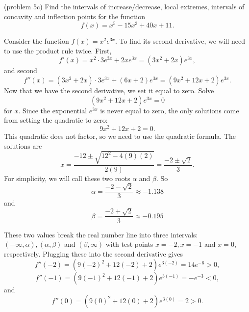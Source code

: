 \documentclass[handout]{ximera}
\begin{document}
\begin{problem}(problem 5c) Find the intervals of increase/decrease, local extremes, intervals of concavity and inflection points for the function
\[
f(x) = x^5 - 15x^3 + 40x + 11.
\]
\end{problem}


\begin{example}[example 6]
Consider the function $f(x) = x^2e^{3x}$.  To find its second derivative, 
we will need to use the product rule twice. First, 
\[f'(x) = x^2 \cdot 3e^{3x} + 2xe^{3x} = (3x^2 + 2x)e^{3x},\]
and second
\[f''(x) = (3x^2 + 2x)\cdot 3e^{3x} + (6x + 2)e^{3x} = (9x^2 + 12x + 2)e^{3x}.\]
Now that we have the second derivative, we set it equal to zero.  Solve
\[(9x^2 + 12x + 2)e^{3x}=0\]
for $x$.
Since the exponential $e^{3x}$ is never equal to zero, the only solutions come from setting the quadratic to zero:
\[9x^2 + 12x + 2=0.\]
This quadratic does not factor, so we need to use the quadratic formula.
The solutions are 
\[x = \frac{-12 \pm \sqrt{12^2 - 4(9)(2)}}{2(9)} = \frac{-2 \pm \sqrt{2}}{3}.\]
For simplicity, we will call these two roots $\alpha$ and $\beta$.
So 
\[\alpha = \frac{-2 - \sqrt{2}}{3} \approx -1.138\]
and
\[\beta = \frac{-2 + \sqrt{2}}{3} \approx -0.195\]

These two values break the real number line into three intervals: $(-\infty, \alpha), 
(\alpha, \beta)$ and $(\beta, \infty)$ with test points
$x = -2, x = -1$ and $x = 0$, respectively.
Plugging these into the second derivative gives
\[f''(-2) = (9(-2)^2 + 12(-2) + 2)e^{3(-2)} = 14e^{-6} > 0,\]
\[f''(-1) = (9(-1)^2 + 12(-1) + 2)e^{3(-1)} = -e^{-3} < 0,\]
and
\[f''(0) = (9(0)^2 + 12(0) + 2)e^{3(0)} = 2 > 0.\]







\begin{image}
\end{image}
\end{example}
\end{document}
